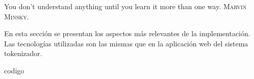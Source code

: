 %
%

{
  \epigrafe
  {%
    You don't understand anything until you learn it more than one way.%
  }
  {%
    \textsc{Marvin Minsky}.%
  }
}

En esta sección se presentan los aspectos más relevantes de la implementación.
Las tecnologías utilizadas son las mismas que en la aplicación web del sistema
tokenizador.

{codigo}
